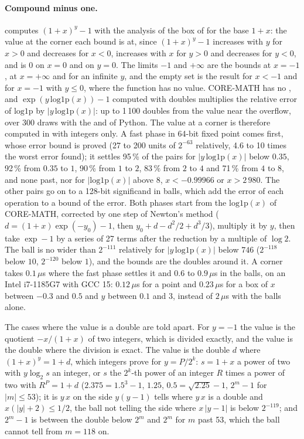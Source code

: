 \paragraph{Compound minus one.}%
 computes $(1+x)^y-1$ with the analysis of the box
of  for the base $1+x$: the value at the corner each bound is
at, since $(1+x)^y-1$ increases with $y$ for $x>0$ and decreases for
$x<0$, increases with $x$ for $y>0$ and decreases for $y<0$, and is $0$ on
$x=0$ and on $y=0$. The limits $-1$ and $+\infty$ are the bounds at
$x=-1$, at $x=+\infty$ and for an infinite $y$, and the empty set is the
result for $x<-1$ and for $x=-1$ with $y\leq0$, where the function has no
value. CORE-MATH has no , and
$\exp(y\,\mathrm{log1p}(x))-1$ computed with doubles multiplies the
relative error of $\mathrm{log1p}$ by $|y\,\mathrm{log1p}(x)|$: up to
1\,100 doubles from the value near the overflow, over 300 draws with the
 and  of Python. The value at a corner is
therefore computed in  with integers
only. A fast phase in 64-bit fixed point comes first, whose error bound is
proved (27 to 200 units of $2^{-63}$ relatively, 4.6 to 10 times the worst
error found); it settles 95\,\% of the pairs for $|y\,\mathrm{log1p}(x)|$
below $0.35$, 92\,\% from $0.35$ to $1$, 90\,\% from $1$ to $2$, 83\,\%
from $2$ to $4$ and 71\,\% from $4$ to $8$, and none past, nor for
$|\mathrm{log1p}(x)|$ above $8$, $x<-0.99966$ or $x>2\,980$. The other
pairs go on to a 128-bit significand in balls, which add the error of each
operation to a bound of the error. Both phases start from the
$\mathrm{log1p}(x)$ of CORE-MATH, corrected by one step of Newton's method
($d=(1+x)\exp(-y_0)-1$, then $y_0+d-d^2/2+d^3/3$), multiply it by $y$,
then take $\exp-1$ by a series of 27 terms after the reduction by a
multiple of $\log2$. The ball is no wider than $2^{-111}$ relatively for
$|y\,\mathrm{log1p}(x)|$ below $746$ ($2^{-118}$ below $10$, $2^{-120}$
below $1$), and the bounds are the doubles around it. A corner takes
$0.1\,\mu$s where the fast phase settles it and $0.6$ to $0.9\,\mu$s in
the balls, on an Intel i7-1185G7 with GCC 15: $0.12\,\mu$s for a point and
$0.23\,\mu$s for a box of $x$ between $-0.3$ and $0.5$ and $y$ between
$0.1$ and $3$, instead of $2\,\mu$s with the balls alone.

The cases where the value is a double are told apart. For $y=-1$ the value
is the quotient $-x/(1+x)$ of two integers, which is divided exactly, and
the value is the double where the division is exact. The value is the
double $d$ where $(1+x)^y=1+d$, which integers prove for $y=P/2^k$:
$s=1+x$ a power of two with $y\log_2 s$ an integer, or $s$ the $2^k$-th
power of an integer $R$ times a power of two with $R^P=1+d$
($2.375=1.5^3-1$, $1.25$, $0.5=\sqrt{2.25}-1$, $2^m-1$ for $|m|\leq53$);
it is $y\,x$ on the side $y(y-1)$ tells where $y\,x$ is a double and
$x(|y|+2)\leq1/2$, the ball not telling the side where $x\,|y-1|$ is below
$2^{-119}$; and $2^m-1$ is between the double below $2^m$ and $2^m$ for
$m$ past 53, which the ball cannot tell from $m=118$ on.\newinvfive

